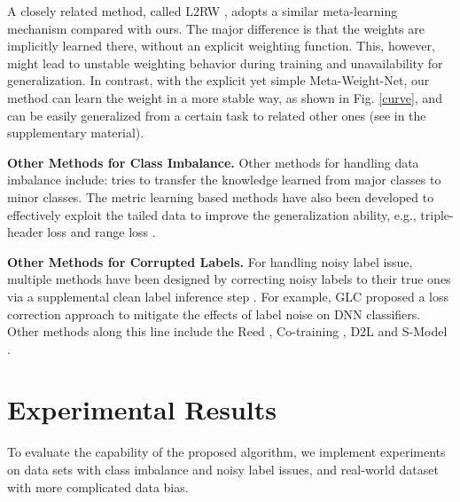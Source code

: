 \documentclass{article}
\begin{document}
	A closely related method, called L2RW \cite{ren2018learning}, adopts a similar meta-learning mechanism compared with ours. The major difference is that the weights are implicitly learned there, without an explicit weighting function. This, however, might lead to unstable weighting behavior during training and unavailability for generalization. In contrast, with the explicit yet simple Meta-Weight-Net, our method can learn the weight in a more stable way, as shown in Fig. \ref{curve}, and can be easily generalized from a certain task to related other ones (see in the supplementary material).


	\textbf{Other Methods for Class Imbalance.} Other methods for handling data imbalance include: \cite{wang2017learning,cui2018large} tries to transfer the knowledge learned from major classes to minor classes. The metric learning based methods have also been developed to effectively exploit the tailed data to improve the generalization ability, e.g., triple-header loss \cite{huang2016learning} and range loss \cite{zhang2017range}.
	
	\textbf{Other Methods for Corrupted Labels.} For handling noisy label issue, multiple methods have been designed by correcting noisy labels to their true ones via a supplemental clean label inference step \cite{azadi2015auxiliary,vahdat2017toward,veit2017learning,li2017learning,jiang2018mentornet,ren2018learning,hendrycks2018using}.
	For example,
GLC \cite{hendrycks2018using} proposed a loss correction approach to mitigate the effects of label noise on DNN classifiers. Other methods along this line include the Reed \cite{reed2014training}, Co-training \cite{han2018co}, D2L \cite{ma2018dimensionality} and S-Model \cite{goldberger2016training}.
	\vspace{0mm}
	\section{Experimental Results}  \label{section4}\vspace{0mm}
	To evaluate the capability of the proposed algorithm, we implement experiments on data sets with class imbalance and noisy label issues, and real-world dataset with more complicated data bias.
	\vspace{0mm}
\end{document}
